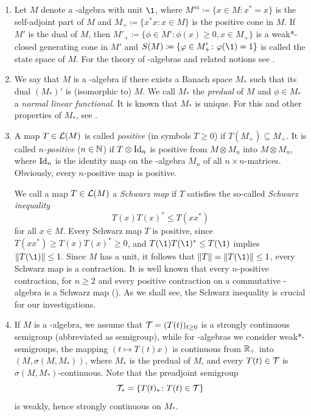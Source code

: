 \begin{enumerate}[1., wide, labelsep=1em]

\item
Let $ M $ denote a \CA-algebra with unit $ \1 $, where 
%
$
	M^{sa} \coloneq \{x \in M \colon x^{*} = x\} 
$
%
is the self-adjoint part of\/ $ M $ and 
%
$
	M_{+} \coloneq \{ x^{*}x \colon x \in M\} 
$
%
is the positive cone in $ M $.
If\/ $ M' $ is the dual of\/ $ M $, then 
%
$
	M'_{+} \coloneq \{\phi \in M' \colon \phi(x) \geq 0, x \in M_{+}\} 
$
%
is a weak*-closed generating cone in $ M' $ and 
%
$
	S(M) \coloneq \{\phi \in M'_{+} \colon \phi(\1) = 1\} 
$
%
is called the state space of\/ $ M $. 
For the theory of \CA-algebras and related notions see \textcite{pedersen:1979}.

\item
We say that $ M $ is a \WA-algebra if there exists a Banach space $ M_{*} $ such that its dual $ (M_{*})' $ is (isomorphic to) $ M $.
We call $ M_{*} $ the \emph{predual} of\/ $ M $ and $ \phi \in M_{*} $ a \emph{normal linear functional}.
It is known that $ M_{*} $ is unique. %
For this and other properties of\/ $M_{*} $, see \textcite[Chapter III]{takesaki:1979}.

\item
A map $ T \in \mathcal{L}(M) $ is called \emph{positive} (in symbols $ T \geq 0 $) if\/ $ T(M_{+}) \subseteq M_{+} $.
It is called \emph{$n$-positive} ($ n \in \mathbb{N} $) if\/ $ T \otimes \operatorname{Id} _{n} $ is positive from $ M \otimes M_{n} $ into $ M \otimes M_{n} $, where $ \operatorname{Id} _{n} $ is the identity map on the \CA-algebra $ M_{n} $ of all $ n \times n $-matrices.
Obviously, every $n$-positive map is positive.

We call a map $ T \in \mathcal{L}(M) $ a \emph{Schwarz map} if\/ $ T $ satisfies the so-called \emph{Schwarz inequality}
\[
	T(x)T(x)^{*} \leq T(xx^{*}) 
\]
for all $ x \in M $.
Every Schwarz map $ T $ is positive, since $ T(xx^{*}) \geq T(x)T(x)^{*} \geq 0 $, and $ T(\1)T(\1)^{*} \leq T(\1) $ implies $ \|T(\1)\| \leq 1 $.
Since $ M $ has a unit, it follows that $ \|T\| = \|T(\1)\| \leq 1 $, \ie every Schwarz map is a contraction.
It is well known that every $n$-positive contraction, for $ n \geq 2 $ and every positive contraction on a commutative \CA-algebra is a Schwarz map (\textcite[Chapter IV]{takesaki:1979}).%
As we shall see, the Schwarz inequality is crucial for our investigations.

\item 
If\/ $ M $ is a \CA-algebra, we assume that $ \TT = (T(t))_{t \geq 0} $ is a strongly continuous semigroup (abbreviated as semigroup), while for \WA-algebras we consider weak*-semigroups, \ie the mapping $ (t \mapsto T(t)x) $ is continuous from $ \mathbb{R}_{+} $ into $ (M,\sigma(M,M_{*}))$, where $ M_{*} $ is the predual of\/ $ M $, and every $ T(t) \in \mathcal{T} $ is $ \sigma(M,M_{*}) $-continuous.
Note that the preadjoint semigroup
\[
	\mathcal{T}_{*} = \{ T(t)_{*} \colon T(t) \in \mathcal{T} \}
\]
is weakly, hence strongly continuous on $ M_{*} $. 


\end{enumerate}
